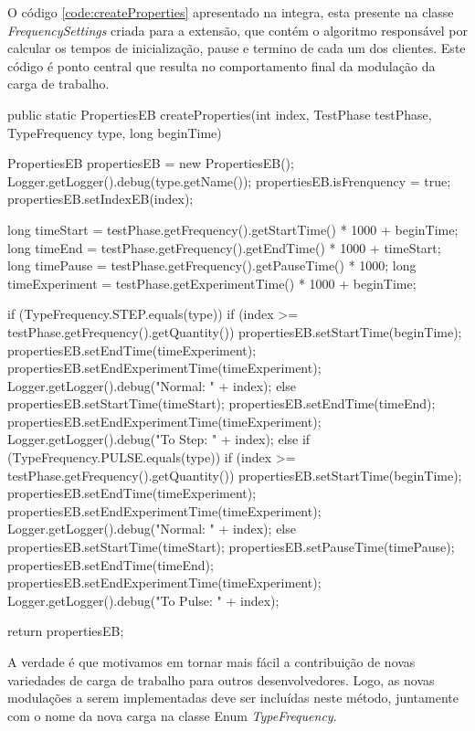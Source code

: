 O código \ref{code:createProperties} apresentado na integra, esta presente na classe \textit{FrequencySettings} criada para a extensão, que contém o algoritmo responsável por calcular os tempos de inicialização, pause e termino de cada um dos clientes. Este código é ponto central que resulta no comportamento final da modulação da carga de trabalho.

\begin{codigo}[caption={Algoritmo calcula os tempos de iniciaçização e termino para cada um dos Clientes}, label={code:createProperties}, breaklines=true]
	public static PropertiesEB createProperties(int index, TestPhase testPhase, TypeFrequency type, long beginTime) {
		
		PropertiesEB propertiesEB = new PropertiesEB();
		Logger.getLogger().debug(type.getName());
		propertiesEB.isFrenquency = true;
		propertiesEB.setIndexEB(index);
		
		long timeStart = testPhase.getFrequency().getStartTime() * 1000 + beginTime;
		long timeEnd   = testPhase.getFrequency().getEndTime() * 1000 + timeStart;
		long timePause = testPhase.getFrequency().getPauseTime() * 1000;
		long timeExperiment = testPhase.getExperimentTime() * 1000 + beginTime;
		
		if (TypeFrequency.STEP.equals(type)) {
			if (index >= testPhase.getFrequency().getQuantity()) {
				propertiesEB.setStartTime(beginTime);
				propertiesEB.setEndTime(timeExperiment);
				propertiesEB.setEndExperimentTime(timeExperiment);
				Logger.getLogger().debug("Normal: " + index);
			} else {
				propertiesEB.setStartTime(timeStart);
				propertiesEB.setEndTime(timeEnd);
				propertiesEB.setEndExperimentTime(timeExperiment);
				Logger.getLogger().debug("To Step: " + index);
			}
		} else if (TypeFrequency.PULSE.equals(type)) {
			if (index >= testPhase.getFrequency().getQuantity()) {
				propertiesEB.setStartTime(beginTime);
				propertiesEB.setEndTime(timeExperiment);
				propertiesEB.setEndExperimentTime(timeExperiment);
				Logger.getLogger().debug("Normal: " + index);
			} else {
				propertiesEB.setStartTime(timeStart);
				propertiesEB.setPauseTime(timePause);
				propertiesEB.setEndTime(timeEnd);
				propertiesEB.setEndExperimentTime(timeExperiment);
				Logger.getLogger().debug("To Pulse: " + index);
			}
		}

		return propertiesEB;

	}

\end{codigo}
A verdade é que motivamos em tornar mais fácil a contribuição de novas variedades de carga de trabalho para outros desenvolvedores. Logo, as novas modulações a serem implementadas deve ser incluídas neste método, juntamente com o nome da nova carga na classe Enum \textit{TypeFrequency}.


